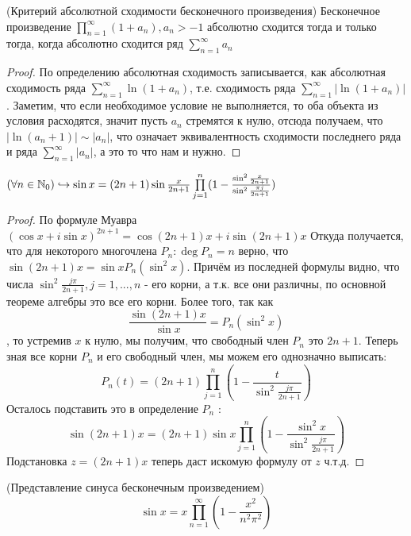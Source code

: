 \begin{theorem}
	(Критерий абсолютной сходимости бесконечного произведения) Бесконечное произведение $\prod\limits_{n=1}^\infty (1+a_n), a_n > -1$ абсолютно сходится тогда и только тогда, когда абсолютно сходится ряд $\sum\limits_{n=1}^\infty a_n$
\end{theorem}

\begin{proof}
	По определению абсолютная сходимость записывается, как абсолютная сходимость ряда $\sum\limits_{n=1}^\infty \ln{(1 + a_n)}$, т.е. сходимость ряда $\sum\limits_{n=1}^\infty |\ln{(1 + a_n)|}$. Заметим, что если необходимое условие не выполняется, то оба объекта из условия расходятся, значит пусть $a_n$ стремятся к нулю, отсюда получаем, что $|\ln{(a_n + 1)}|\sim|a_n|$, что означает эквивалентность сходимости последнего ряда и ряда $\sum\limits_{n=1}^\infty |a_n|$, а это то что нам и нужно.
\end{proof}

\begin{lemma}
	$(\forall n\in\mathbb{N}_0)\hookrightarrow\sin{x} = (2n + 1)\sin{\frac{x}{2n+1}}\prod\limits_{j=1}^n (1 - \frac{\sin^2{\frac{x}{2n+1}}}{\sin^2{\frac{\pi j}{2n+1}}})$
\end{lemma}

\begin{proof}
	По формуле Муавра $(\cos{x} +i\sin{x})^{2n+1} = \cos{(2n+1)x} +i\sin{(2n+1)x}$ Откуда получается, что для некоторого многочлена $P_n : \deg{P_n} = n$ верно, что $\sin{(2n+1)x} = \sin{x} P_n(\sin^2{x})$. Причём из последней формулы видно, что числа $\sin^2{\frac{j\pi}{2n+1}}, j = 1,...,n$ - его корни, а т.к. все они различны, по основной теореме алгебры это все его корни. Более того, так как
	\[
	\frac{\sin{(2n+1)x}}{\sin{x}} =  P_n(\sin^2{x})
	\], то устремив $x$ к нулю, мы получим, что свободный член $P_n$ это $2n+1$. Теперь зная все корни $P_n$ и его свободный член, мы можем его однозначно выписать:
	\[
	P_n(t) = (2n+1)\prod\limits_{j=1}^n (1-\frac{t}{\sin^2{\frac{j\pi}{2n+1}}})
	\]
	Осталось подставить это в определение $P_n$ :
	\[
	\sin{(2n+1)x} = (2n+1)\sin{x}\prod\limits_{j=1}^n (1-\frac{\sin^2{x}}{\sin^2{\frac{j\pi}{2n+1}}}) 
	\]
	Подстановка $z = (2n+1)x$ теперь даст искомую формулу от $z$ ч.т.д.
\end{proof}

\begin{theorem}
	(Представление синуса бесконечным произведением)
	\[
	\sin{x} = x\prod\limits_{n=1}^\infty (1-\frac{x^2}{n^2\pi^2})
	\]
\end{theorem}

